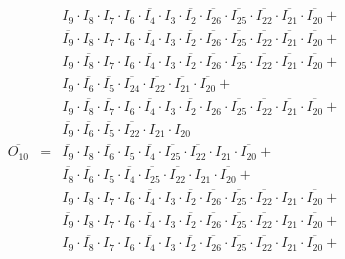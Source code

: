 \documentclass[a4paper,russian]{report}
\begin{document}
\begin{eqnarray*}
	& &  I_{9} \cdotp I_{8} \cdotp I_{7} \cdotp I_{6} \cdotp \overline{I_{4}} \cdotp I_{3} \cdotp \overline{I_{2}} \cdotp \overline{I_{26}} \cdotp \overline{I_{25}} \cdotp \overline{I_{22}} \cdotp \overline{I_{21}} \cdotp \overline{I_{20}} + \\
	& &  \overline{I_{9}} \cdotp I_{8} \cdotp I_{7} \cdotp I_{6} \cdotp \overline{I_{4}} \cdotp I_{3} \cdotp \overline{I_{2}} \cdotp \overline{I_{26}} \cdotp \overline{I_{25}} \cdotp \overline{I_{22}} \cdotp \overline{I_{21}} \cdotp \overline{I_{20}} + \\
	& &  I_{9} \cdotp \overline{I_{8}} \cdotp I_{7} \cdotp I_{6} \cdotp \overline{I_{4}} \cdotp I_{3} \cdotp \overline{I_{2}} \cdotp \overline{I_{26}} \cdotp \overline{I_{25}} \cdotp \overline{I_{22}} \cdotp \overline{I_{21}} \cdotp \overline{I_{20}} + \\
	& &  I_{9} \cdotp \overline{I_{6}} \cdotp \overline{I_{5}} \cdotp \overline{I_{24}} \cdotp \overline{I_{22}} \cdotp \overline{I_{21}} \cdotp \overline{I_{20}} + \\
	& &  I_{9} \cdotp \overline{I_{8}} \cdotp \overline{I_{7}} \cdotp I_{6} \cdotp \overline{I_{4}} \cdotp I_{3} \cdotp \overline{I_{2}} \cdotp I_{26} \cdotp \overline{I_{25}} \cdotp \overline{I_{22}} \cdotp \overline{I_{21}} \cdotp \overline{I_{20}} + \\
	& &  \overline{I_{9}} \cdotp \overline{I_{6}} \cdotp \overline{I_{5}} \cdotp \overline{I_{22}} \cdotp I_{21} \cdotp I_{20} \\
    \overline{O_{10}} & = & \overline{I_{9}} \cdotp I_{8} \cdotp \overline{I_{6}} \cdotp I_{5} \cdotp \overline{I_{4}} \cdotp \overline{I_{25}} \cdotp \overline{I_{22}} \cdotp I_{21} \cdotp \overline{I_{20}} + \\
	& &  \overline{I_{8}} \cdotp \overline{I_{6}} \cdotp I_{5} \cdotp \overline{I_{4}} \cdotp \overline{I_{25}} \cdotp \overline{I_{22}} \cdotp I_{21} \cdotp \overline{I_{20}} + \\
	& &  I_{9} \cdotp I_{8} \cdotp I_{7} \cdotp I_{6} \cdotp \overline{I_{4}} \cdotp I_{3} \cdotp \overline{I_{2}} \cdotp \overline{I_{26}} \cdotp \overline{I_{25}} \cdotp \overline{I_{22}} \cdotp I_{21} \cdotp \overline{I_{20}} + \\
	& &  \overline{I_{9}} \cdotp I_{8} \cdotp I_{7} \cdotp I_{6} \cdotp \overline{I_{4}} \cdotp I_{3} \cdotp \overline{I_{2}} \cdotp \overline{I_{26}} \cdotp \overline{I_{25}} \cdotp \overline{I_{22}} \cdotp I_{21} \cdotp \overline{I_{20}} + \\
	& &  I_{9} \cdotp \overline{I_{8}} \cdotp I_{7} \cdotp I_{6} \cdotp \overline{I_{4}} \cdotp I_{3} \cdotp \overline{I_{2}} \cdotp \overline{I_{26}} \cdotp \overline{I_{25}} \cdotp \overline{I_{22}} \cdotp I_{21} \cdotp \overline{I_{20}} + \\

\end{eqnarray*}
\end{document}
